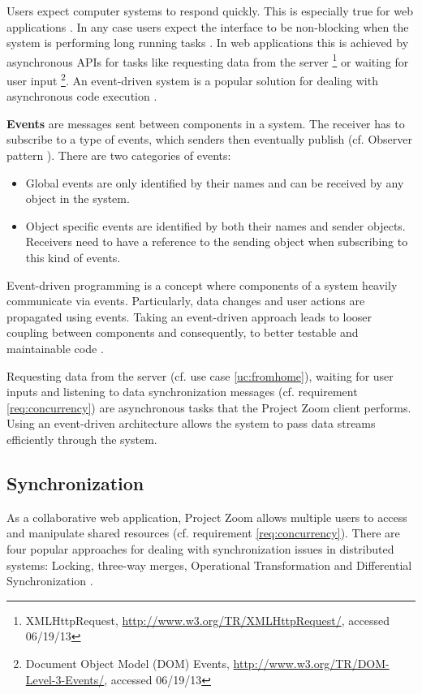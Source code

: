 Users expect computer systems to respond quickly. This is especially true for web applications \cite{Selvidge_1999}. In any case users expect the interface to be non-blocking when the system is performing long running tasks \cite{Nielsen_1994}.  In web applications this is achieved by asynchronous APIs for tasks like requesting data from the server \footnote{XMLHttpRequest, \url{http://www.w3.org/TR/XMLHttpRequest/}, accessed 06/19/13} or waiting for user input \footnote{Document Object Model (DOM) Events, \url{http://www.w3.org/TR/DOM-Level-3-Events/}, accessed 06/19/13}. An event-driven system is a popular solution for dealing with asynchronous code execution \cite{Michelson_2006}. 

\textbf{Events} are messages sent between components in a system. The receiver has to subscribe to a type of events, which senders then eventually publish (cf. Observer pattern \cite{Gamma_1994}). There are two categories of events:
\begin{itemize}
\item Global events are only identified by their names and can be received by any object in the system.
\item Object specific events are identified by both their names and sender objects. Receivers need to have a reference to the sending object when subscribing to this kind of events.
\end{itemize}

Event-driven programming is a concept where components of a system heavily communicate via events. Particularly, data changes and user actions are propagated using events. Taking an event-driven approach leads to looser coupling between components and consequently, to better testable and maintainable code \cite{Faison_2011}.

Requesting data from the server (cf. use case \ref{uc:fromhome}), waiting for user inputs and listening to data synchronization messages (cf. requirement \ref{req:concurrency}) are asynchronous tasks that the Project Zoom client performs. Using an event-driven architecture allows the system to pass data streams efficiently through the system.

\subsection{Synchronization}
As a collaborative web application, Project Zoom allows multiple users to access and manipulate shared resources (cf. requirement \ref{req:concurrency}). There are four popular approaches for dealing with synchronization issues in distributed systems: Locking, three-way merges, Operational Transformation and Differential Synchronization \cite{Fraser_2009}.

